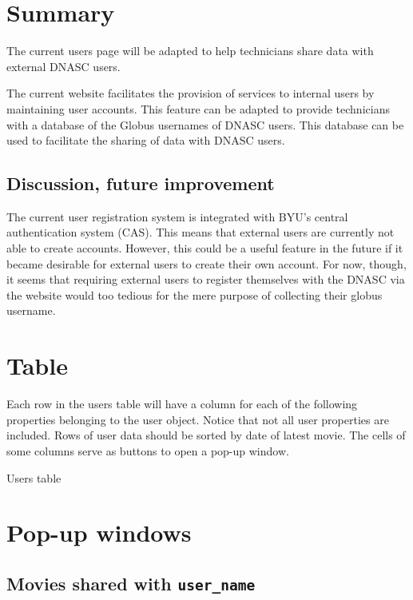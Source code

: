 \section{Summary}

The current users page will be adapted to help technicians share data with 
external DNASC users.

The current website facilitates the provision of services to internal users by
maintaining user accounts. This feature can be adapted to provide technicians
with a database of the Globus usernames of DNASC users. This database can be
used to facilitate the sharing of data with DNASC users.

\subsection{Discussion, future improvement}
The current user registration system is integrated with BYU's central 
authentication system (CAS). This means that external users are currently not 
able to create accounts. However, this could be a useful feature in the future 
if it became desirable for external users to create their own account. For now, 
though, it seems that requiring external users to register themselves with the 
DNASC via the website would too tedious for the mere purpose of collecting their
globus username.

\section{Table}

Each row in the users table will have a column for each of the following 
properties belonging to the user object. Notice that not all user properties 
are included. Rows of user data should be sorted by date of latest movie. 
The cells of some columns serve as buttons to open a pop-up window.

\begin{table}[h]
    
    \caption{Users table}
\end{table}

\section{Pop-up windows}

\subsection{Movies shared with \texttt{user\_name}}

